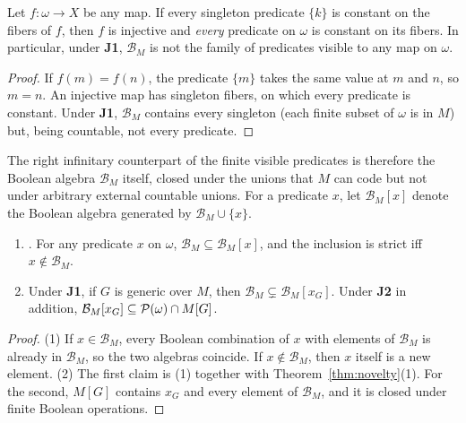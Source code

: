 \begin{proposition}\label{prop:nolens}
Let $f\colon\omega\to X$ be any map. If every singleton predicate $\{k\}$ is constant on the fibers
of $f$, then $f$ is injective and \emph{every} predicate on $\omega$ is constant on its fibers. In
particular, under \textbf{J1}, $\mathcal B_M$ is not the family of predicates visible to any map on
$\omega$.
\end{proposition}

\begin{proof}
If $f(m)=f(n)$, the predicate $\{m\}$ takes the same value at $m$ and $n$, so $m=n$. An injective
map has singleton fibers, on which every predicate is constant. Under \textbf{J1},
$\mathcal B_M$ contains every singleton (each finite subset of $\omega$ is in $M$) but, being
countable, not every predicate.
\end{proof}

The right infinitary counterpart of the finite visible predicates is therefore the Boolean algebra
$\mathcal B_M$ itself, closed under the unions that $M$ can code but not under arbitrary external
countable unions. For a predicate $x$, let $\mathcal B_M[x]$ denote the Boolean algebra generated by
$\mathcal B_M\cup\{x\}$.

\begin{theorem}\label{thm:strict}
\begin{enumerate}\itemsep0pt
\item \inhouse. For any predicate $x$ on $\omega$, $\mathcal B_M\subseteq\mathcal B_M[x]$, and the
inclusion is strict iff $x\notin\mathcal B_M$.
\item Under \textbf{J1}, if $G$ is generic over $M$, then $\mathcal B_M\subsetneq\mathcal
B_M[x_G]$. Under \textbf{J2} in addition, $\mathcal B_M[x_G]\subseteq\mathcal{P}(\omega)\cap M[G]$.
\end{enumerate}
\end{theorem}

\begin{proof}
(1) If $x\in\mathcal B_M$, every Boolean combination of $x$ with elements of $\mathcal B_M$ is
already in $\mathcal B_M$, so the two algebras coincide. If $x\notin\mathcal B_M$, then $x$ itself
is a new element. (2) The first claim is (1) together with Theorem~\ref{thm:novelty}(1). For the
second, $M[G]$ contains $x_G$ and every element of $\mathcal B_M$, and it is closed under finite
Boolean operations.
\end{proof}

